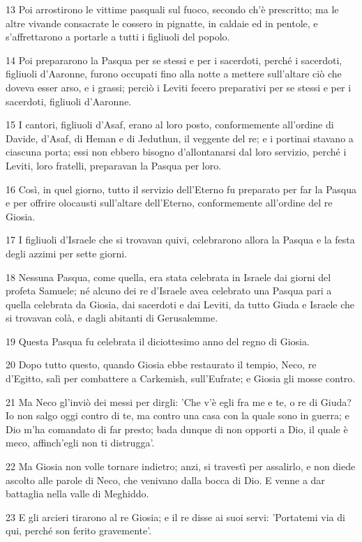 \par 13 Poi arrostirono le vittime pasquali sul fuoco, secondo ch'è prescritto; ma le altre vivande consacrate le cossero in pignatte, in caldaie ed in pentole, e s'affrettarono a portarle a tutti i figliuoli del popolo.
\par 14 Poi prepararono la Pasqua per se stessi e per i sacerdoti, perché i sacerdoti, figliuoli d'Aaronne, furono occupati fino alla notte a mettere sull'altare ciò che doveva esser arso, e i grassi; perciò i Leviti fecero preparativi per se stessi e per i sacerdoti, figliuoli d'Aaronne.
\par 15 I cantori, figliuoli d'Asaf, erano al loro posto, conformemente all'ordine di Davide, d'Asaf, di Heman e di Jeduthun, il veggente del re; e i portinai stavano a ciascuna porta; essi non ebbero bisogno d'allontanarsi dal loro servizio, perché i Leviti, loro fratelli, preparavan la Pasqua per loro.
\par 16 Così, in quel giorno, tutto il servizio dell'Eterno fu preparato per far la Pasqua e per offrire olocausti sull'altare dell'Eterno, conformemente all'ordine del re Giosia.
\par 17 I figliuoli d'Israele che si trovavan quivi, celebrarono allora la Pasqua e la festa degli azzimi per sette giorni.
\par 18 Nessuna Pasqua, come quella, era stata celebrata in Israele dai giorni del profeta Samuele; né alcuno dei re d'Israele avea celebrato una Pasqua pari a quella celebrata da Giosia, dai sacerdoti e dai Leviti, da tutto Giuda e Israele che si trovavan colà, e dagli abitanti di Gerusalemme.
\par 19 Questa Pasqua fu celebrata il diciottesimo anno del regno di Giosia.
\par 20 Dopo tutto questo, quando Giosia ebbe restaurato il tempio, Neco, re d'Egitto, salì per combattere a Carkemish, sull'Eufrate; e Giosia gli mosse contro.
\par 21 Ma Neco gl'inviò dei messi per dirgli: 'Che v'è egli fra me e te, o re di Giuda? Io non salgo oggi contro di te, ma contro una casa con la quale sono in guerra; e Dio m'ha comandato di far presto; bada dunque di non opporti a Dio, il quale è meco, affinch'egli non ti distrugga'.
\par 22 Ma Giosia non volle tornare indietro; anzi, si travestì per assalirlo, e non diede ascolto alle parole di Neco, che venivano dalla bocca di Dio. E venne a dar battaglia nella valle di Meghiddo.
\par 23 E gli arcieri tirarono al re Giosia; e il re disse ai suoi servi: 'Portatemi via di qui, perché son ferito gravemente'.
